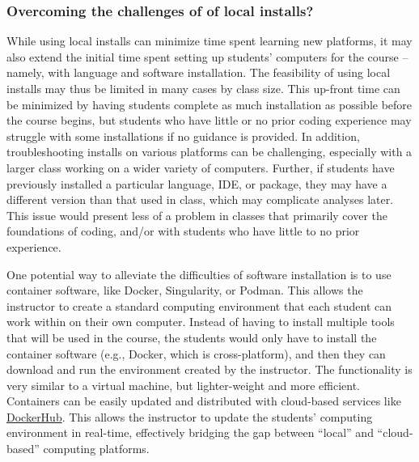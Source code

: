 \subsubsection{Overcoming the challenges of of local installs?} 

While using local installs can minimize time spent learning new platforms, it may also extend the initial time spent setting up students' computers for the course -- namely, with language and software installation. The feasibility of using local installs may thus be limited in many cases by class size. This up-front time can be minimized by having students complete as much installation as possible before the course begins, but students who have little or no prior coding experience may struggle with some installations if no guidance is provided. In addition, troubleshooting installs on various platforms can be challenging, especially with a larger class working on a wider variety of computers. Further, if students have previously installed a particular language, IDE, or package, they may have a different version than that used in class, which may complicate analyses later. This issue would present less of a problem in classes that primarily cover the foundations of coding, and/or with students who have little to no prior experience.

One potential way to alleviate the difficulties of software installation is to
use container software, like
Docker,
Singularity,
or
Podman.
This allows the instructor to create a standard computing environment that each
student can work within on their own computer.
Instead of having to install multiple tools that will be used in the course,
the students would only have to install the container software (e.g., Docker,
which is cross-platform), and then they can download and run the environment
created by the instructor.
The functionality is very similar to a virtual machine, but lighter-weight and
more efficient.
Containers can be easily updated and distributed with cloud-based
services like
\href{https://hub.docker.com/}{DockerHub}.
This allows the instructor to update the students' computing environment in
real-time, effectively bridging the gap between ``local'' and ``cloud-based''
computing platforms.

